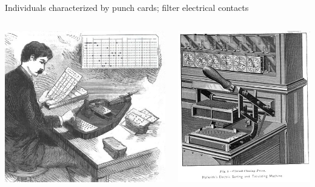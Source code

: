 \documentclass[aspectratio=169]{beamer}
\begin{document}
\begin{frame}{Individuals characterized by punch cards; filter electrical contacts}
\vspace{0.17 cm}
\begin{columns}
\includegraphics[width=\linewidth]{1890_Census_Hollerith_Pantograph_Punching_Machine_Sci_Amer.jpg}

\includegraphics[width=\linewidth]{1890_Hollerith_Circuit-Closing_Press_OM.jpg}
\end{columns}
\end{frame}
\end{document}
